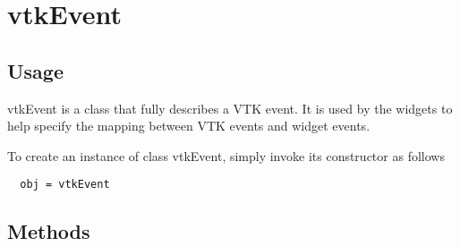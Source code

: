 \section{vtkEvent}

\subsection{Usage}

 vtkEvent is a class that fully describes a VTK event. It is used by the 
 widgets to help specify the mapping between VTK events and widget events.

To create an instance of class vtkEvent, simply
invoke its constructor as follows
\begin{verbatim}
  obj = vtkEvent
\end{verbatim}
\subsection{Methods}

